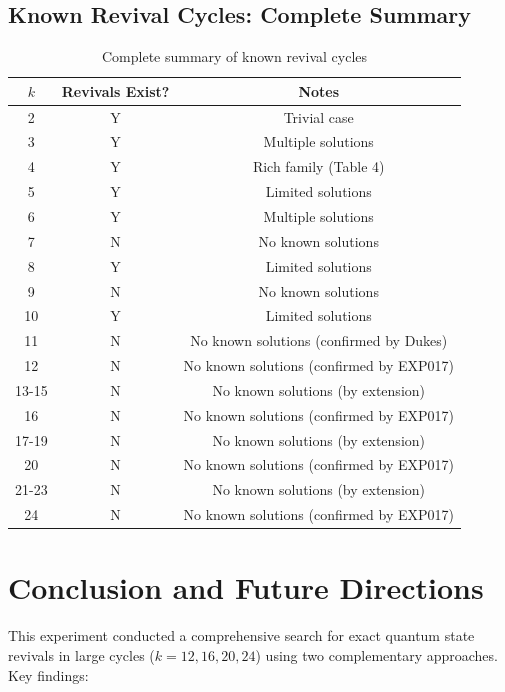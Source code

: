 \documentclass[12pt]{article}
\begin{document}
\subsection{Known Revival Cycles: Complete Summary}

\begin{table}[H]
\centering
\caption{Complete summary of known revival cycles}
\label{tab:known}
\begin{tabular}{ccc}
\toprule
$k$ & Revivals Exist? & Notes \\
\midrule
2 &Y & Trivial case \\
3 &Y & Multiple solutions \\
4 &Y & Rich family (Table 4) \\
5 &Y & Limited solutions \\
6 &Y & Multiple solutions \\
7 & N & No known solutions \\
8 &Y & Limited solutions \\
9 & N & No known solutions \\
10 &Y & Limited solutions \\
11 & N & No known solutions (confirmed by Dukes) \\
12 & N & No known solutions (confirmed by EXP017) \\
13-15 & N & No known solutions (by extension) \\
16 & N & No known solutions (confirmed by EXP017) \\
17-19 & N & No known solutions (by extension) \\
20 & N & No known solutions (confirmed by EXP017) \\
21-23 & N & No known solutions (by extension) \\
24 & N & No known solutions (confirmed by EXP017) \\
\bottomrule
\end{tabular}
\end{table}

\section{Conclusion and Future Directions}

This experiment conducted a comprehensive search for exact quantum state revivals in large cycles ($k = 12, 16, 20, 24$) using two complementary approaches. Key findings:
\end{document}
